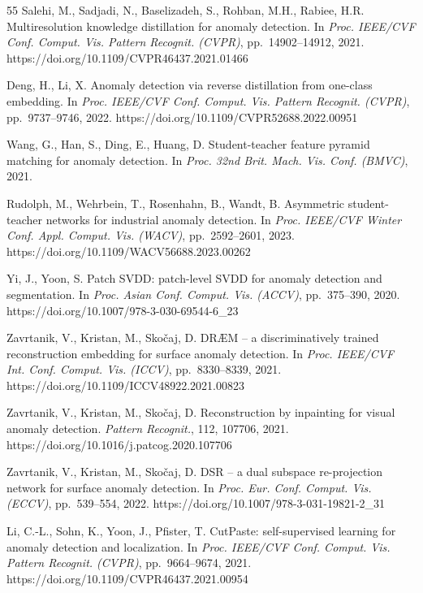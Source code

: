 \documentclass[lettersize,journal]{IEEEtran}
\begin{document}
\begin{thebibliography}{55}
Salehi, M., Sadjadi, N., Baselizadeh, S., Rohban, M.H., Rabiee, H.R. Multiresolution knowledge distillation for anomaly detection. In \textit{Proc. IEEE/CVF Conf. Comput. Vis. Pattern Recognit. (CVPR)}, pp.~14902--14912, 2021. https://doi.org/10.1109/CVPR46437.2021.01466

Deng, H., Li, X. Anomaly detection via reverse distillation from one-class embedding. In \textit{Proc. IEEE/CVF Conf. Comput. Vis. Pattern Recognit. (CVPR)}, pp.~9737--9746, 2022. https://doi.org/10.1109/CVPR52688.2022.00951

Wang, G., Han, S., Ding, E., Huang, D. Student-teacher feature pyramid matching for anomaly detection. In \textit{Proc. 32nd Brit. Mach. Vis. Conf. (BMVC)}, 2021.

Rudolph, M., Wehrbein, T., Rosenhahn, B., Wandt, B. Asymmetric student-teacher networks for industrial anomaly detection. In \textit{Proc. IEEE/CVF Winter Conf. Appl. Comput. Vis. (WACV)}, pp.~2592--2601, 2023. https://doi.org/10.1109/WACV56688.2023.00262

Yi, J., Yoon, S. Patch SVDD: patch-level SVDD for anomaly detection and segmentation. In \textit{Proc. Asian Conf. Comput. Vis. (ACCV)}, pp.~375--390, 2020. https://doi.org/10.1007/978-3-030-69544-6\_23

Zavrtanik, V., Kristan, M., Sko\v{c}aj, D. DR\AE M -- a discriminatively trained reconstruction embedding for surface anomaly detection. In \textit{Proc. IEEE/CVF Int. Conf. Comput. Vis. (ICCV)}, pp.~8330--8339, 2021. https://doi.org/10.1109/ICCV48922.2021.00823

Zavrtanik, V., Kristan, M., Sko\v{c}aj, D. Reconstruction by inpainting for visual anomaly detection. \textit{Pattern Recognit.}, 112, 107706, 2021. https://doi.org/10.1016/j.patcog.2020.107706

Zavrtanik, V., Kristan, M., Sko\v{c}aj, D. DSR -- a dual subspace re-projection network for surface anomaly detection. In \textit{Proc. Eur. Conf. Comput. Vis. (ECCV)}, pp.~539--554, 2022. https://doi.org/10.1007/978-3-031-19821-2\_31

Li, C.-L., Sohn, K., Yoon, J., Pfister, T. CutPaste: self-supervised learning for anomaly detection and localization. In \textit{Proc. IEEE/CVF Conf. Comput. Vis. Pattern Recognit. (CVPR)}, pp.~9664--9674, 2021. https://doi.org/10.1109/CVPR46437.2021.00954


\end{thebibliography}
\end{document}
